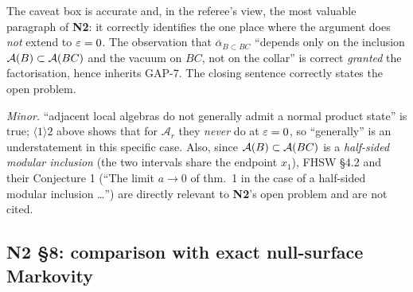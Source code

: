 \documentclass[11pt]{article}
\newcommand{\Ar}{\mathcal A_r}
\newcommand{\NII}{\textbf{N2}}
\newcommand{\1}{\mathbf 1}
\begin{document}
\begin{verdictok}
The caveat box is accurate and, in the referee's view, the most valuable paragraph of \NII{}: it
correctly identifies the one place where the argument does \emph{not} extend to $\varepsilon=0$. The
observation that $\overline\alpha_{B\subset BC}$ ``depends only on the inclusion $\mathcal A(B)\subset\mathcal A(BC)$
and the vacuum on $BC$, not on the collar'' is correct \emph{granted} the factorisation, hence
inherits GAP-7. The closing sentence correctly states the open problem.
\end{verdictok}
\begin{verdictgap}
\emph{Minor.} ``adjacent local algebras do not generally admit a normal product state'' is true;
$\langle1\rangle2$ above shows that for $\Ar$ they \emph{never} do at $\varepsilon=0$, so ``generally'' is an
understatement in this specific case. Also, since $\mathcal A(B)\subset\mathcal A(BC)$ is a \emph{half-sided modular
inclusion} (the two intervals share the endpoint $x_1$), FHSW \S4.2 and their Conjecture 1
(``The limit $a\to0$ of thm.~1 in the case of a half-sided modular inclusion \dots'') are directly
relevant to \NII's open problem and are not cited.
\end{verdictgap}

\subsection{N2 \S8: comparison with exact null-surface Markovity}
\end{document}
